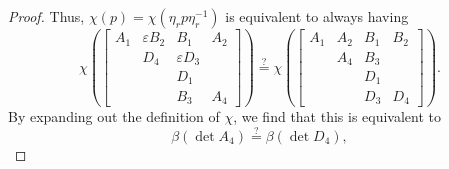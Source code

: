 \begin{proof}
    Thus, $\chi(p)=\chi\left(\eta_rp\eta_r^{-1}\right)$ is equivalent to always having
    \[\chi\left(\begin{bmatrix}
        A_1 & \varepsilon B_2 &  B_1 & A_2 \\
            &  D_4 & \varepsilon D_3 \\
            &      &  D_1 \\
            &      &  B_3 & A_4
    \end{bmatrix}\right)\stackrel?=\chi\left(\begin{bmatrix}
        A_1 & A_2 & B_1 & B_2 \\
            & A_4 & B_3 &     \\
            &     & D_1 &     \\
            &     & D_3 & D_4
    \end{bmatrix}\right).\]
    By expanding out the definition of $\chi$, we find that this is equivalent to
    \[\beta(\det A_4)\stackrel?=\beta(\det D_4),\]

\end{proof}

